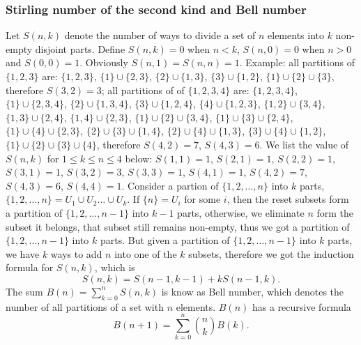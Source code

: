 \subsubsection{Stirling number of the second kind and Bell number}
Let $S(n,k)$ denote the number of ways to divide
a set of $n$ elements into $k$ non-empty disjoint
parts. Define $S(n,k)=0$ when $n < k$, $S(n,0)=0$ when $n>0$
and $S(0,0)=1$. Obviously $S(n,1)=S(n,n)=1$. \newline
Example:	\newline
all partitions of $\{1,2,3\}$ are:	\newline
$\{1,2,3\}$, \newline
$\{1\} \cup \{2,3\}$, $\{2\} \cup \{1,3\}$, $\{3\} \cup \{1,2\}$,	\newline
$\{1\} \cup \{2\} \cup \{3\}$,	\newline
therefore $S(3,2)=3$;
\newline
all partitions of of $\{1,2,3,4\}$ are: \newline
$\{1,2,3,4\}$,	\newline
$\{1\} \cup \{2,3,4\}$, $\{2\} \cup \{1,3,4\}$, $\{3\} \cup \{1,2,4\}$, $\{4\} \cup \{1,2,3\}$,	\newline
$\{1,2\} \cup \{3,4\}$, $\{1,3\} \cup \{2,4\}$, $\{1,4\} \cup \{2,3\}$,	\newline
$\{1\} \cup \{2\} \cup \{3,4\}$, $\{1\} \cup \{3\} \cup \{2,4\}$,	\newline
$\{1\} \cup \{4\} \cup \{2,3\}$, $\{2\} \cup \{3\} \cup \{1,4\}$,	\newline
$\{2\} \cup \{4\} \cup \{1,3\}$, $\{3\} \cup \{4\} \cup \{1,2\}$,	\newline
$\{1\} \cup \{2\} \cup \{3\} \cup \{4\}$,	\newline
therefore $S(4,2)=7$, $S(4,3)=6$.
We list the value of $S(n,k)$ for $1 \leq k \leq n \leq 4$ below:	\newline
$S(1,1)=1$,	\newline
$S(2,1)=1$, $S(2,2)=1$,	\newline
$S(3,1)=1$, $S(3,2)=3$,	$S(3,3)=1$,	\newline
$S(4,1)=1$, $S(4,2)=7$,	$S(4,3)=6$, $S(4,4)=1$.	\newline
Consider a partion of $\{1,2, \dots , n\}$ into $k$ parts,
$\{1,2, \dots , n\} = U_1 \cup U_2 \dots \cup U_k$.
If $\{n\}=U_i$ for some $i$, then the reset subsets
form a partition of $\{1,2, \dots , n-1 \}$ into $k-1$ parts,
otherwise, we eliminate $n$ form the subset it
belongs, that subset still remains non-empty, thus we got
a partition of $\{1,2, \dots , n-1\}$ into $k$ parts.
But given a partition of $\{1,2, \dots , n-1\}$ into $k$ parts,
we have $k$ ways to add $n$ into one of the $k$ subsets,
therefore we got the induction formula for $S(n,k)$, which is
$$S(n,k)=S(n-1,k-1) + k S(n-1,k).$$
The sum $B(n)=\sum_{k=0}^n S(n,k)$ is know as Bell number,
which denotes the number of all partitions of a set with
$n$ elements. $B(n)$ has a recursive formula
$$B(n+1)=\sum_{k=0}^n {n \choose k} B(k).$$

